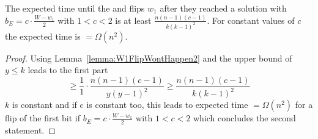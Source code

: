 \begin{corollary}\label{corollary:W1FlipWontHappen}
      The expected time until the \RLSR[k] and \RLSN[k] flips $w_1$ after they reached a solution with $b_E = c\cdot\frac{W-w_1}{2}$ with $1<c<2$ is at least \(\frac{n(n-1)(c-1)}{k{(k-1)}^2}\). For constant values of $c$ the expected time is $=\Omega(n^2)$.
\end{corollary}
\begin{proof}
      Using Lemma~\ref{lemma:W1FlipWontHappen2} and the upper bound of $y\le k$ leads to the first part
      \[ \ge\frac{1}{1}\cdot\frac{n(n-1)(c-1)}{y{(y-1)}^2} \ge\frac{n(n-1)(c-1)}{k{(k-1)}^2}\]
      $k$ is constant and if c is constant too, this leads to expected time $=\Omega(n^2)$ for a flip of the first bit if $b_E = c\cdot\frac{W-w_1}{2}$ with $1<c<2$ which concludes the second statement.
\end{proof}

